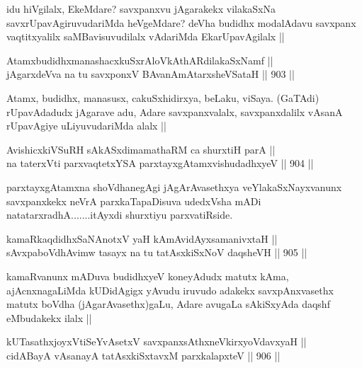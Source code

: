 \begin{artha}
idu hiVgilalx, EkeMdare? savxpanxvu jAgarakekx vilakaSxNa savxrUpavAgiruvudariMda heVgeMdare? deVha budidhx modalAdavu savxpanx vaqtitxyalilx saMBavisuvudilalx vAdariMda EkarUpavAgilalx ||
\end{artha}


\begin{shl}
AtamxbudidhxmanashacxkuSxrAloVkAthARdilakaSxNamf || \\
jAgarxdeVva na tu savxponxV BAvanAmAtarxsheVSataH ||  903 ||  
\end{shl}

\begin{artha}
Atamx, budidhx, manasusx, cakuSxhidirxya, beLaku, viSaya. (GaTAdi) rUpavAdadudx jAgarave adu, Adare savxpanxvalalx, savxpanxdalilx vAsanA rUpavAgiye uLiyuvudariMda alalx ||
\end{artha}

\begin{shl}
AvishicxkiVSuRH sAkASxdimamathaRM ca shurxtiH parA || \\
na taterxVti parxvaqtetxYSA parxtayxgAtamxvishudadhxyeV ||  904 ||  
\end{shl}

\begin{artha}
parxtayxgAtamxna shoVdhanegAgi jAgArAvasethxya veYlakaSxNayxvanunx savxpanxkekx neVrA parxkaTapaDisuva udedxVsha mADi natatarxradhA.......itAyxdi shurxtiyu parxvatiRside.
\end{artha}


\begin{shl}
kamaRkaqdidhxSaNAnotxV yaH kAmAvidAyxsamanivxtaH ||  \\
sAvxpaboVdhAvimw tasayx na tu tatAsxkiSxNoV daqsheVH ||  905 ||  
\end{shl}

\begin{artha}
kamaRvanunx mADuva budidhxyeV koneyAdudx matutx kAma, ajAcnxnagaLiMda kUDidAgigx yAvudu iruvudo adakekx savxpAnxvasethx matutx boVdha (jAgarAvasethx)gaLu, Adare avugaLa sAkiSxyAda daqshf eMbudakekx ilalx ||
\end{artha}


\begin{shl}
kUTasathxjoyxVtiSeYvA\s \s setxV savxpanxsAthxneV\s kirxyoV\s davxyaH || \\
cidABayA vAsanayA tatAsxkiSxtavxM parxkalapxteV ||  906 ||  
\end{shl}

